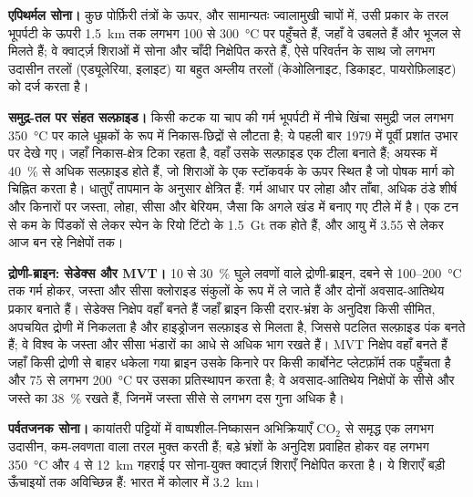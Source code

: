 \textbf{एपिथर्मल सोना।} कुछ पोर्फ़िरी तंत्रों के ऊपर, और सामान्यतः ज्वालामुखी चापों में, उसी प्रकार के
तरल भूपर्पटी के ऊपरी \qty{1.5}{km} तक लगभग 100 से \qty{300}{\celsius} पर पहुँचते हैं, जहाँ वे उबलते हैं
और भूजल से मिलते हैं; वे क्वार्ट्ज़ शिराओं में सोना और चाँदी निक्षेपित करते हैं, ऐसे परिवर्तन के साथ जो
लगभग उदासीन तरलों (एड्यूलेरिया, इलाइट) या बहुत अम्लीय तरलों (केओलिनाइट, डिकाइट, पायरोफ़िलाइट) को
दर्ज करता है।

\textbf{समुद्र-तल पर संहत सल्फ़ाइड।} किसी कटक या चाप की गर्म भूपर्पटी में नीचे खिंचा समुद्री जल लगभग
\qty{350}{\celsius} पर काले धूम्रकों के रूप में निकास-छिद्रों से लौटता है; ये पहली बार 1979 में पूर्वी प्रशांत
उभार पर देखे गए। जहाँ निकास-क्षेत्र टिका रहता है, वहाँ उसके सल्फ़ाइड एक टीला बनाते हैं; अयस्क में
\qty{40}{\percent} से अधिक सल्फ़ाइड होते हैं, जो शिराओं के एक स्टॉकवर्क के ऊपर स्थित है जो पोषक मार्ग को
चिह्नित करता है। धातुएँ तापमान के अनुसार क्षेत्रित हैं: गर्म आधार पर लोहा और ताँबा, अधिक ठंडे शीर्ष और
किनारों पर जस्ता, लोहा, सीसा और बेरियम, जैसा कि अगले खंड में बनाए गए टीले में है।  एक टन से कम के पिंडकों से लेकर स्पेन के रियो टिंटो के \qty{1.5}{Gt} तक होते हैं, और आयु
में \qty{3.55}{\Ga} से लेकर आज बन रहे निक्षेपों तक।

\textbf{द्रोणी-ब्राइन: सेडेक्स और MVT।} 10 से \qty{30}{\percent} घुले लवणों वाले द्रोणी-ब्राइन, दबने से
100--\qty{200}{\celsius} तक गर्म होकर, जस्ता और सीसा क्लोराइड संकुलों के रूप में ले जाते हैं और दोनों
अवसाद-आतिथेय प्रकार बनाते हैं। सेडेक्स निक्षेप वहाँ बनते हैं जहाँ ब्राइन किसी दरार-भ्रंश के अनुदिश किसी
सीमित, अपचयित द्रोणी में निकलता है और हाइड्रोजन सल्फ़ाइड से मिलता है, जिससे पटलित सल्फ़ाइड पंक बनते हैं;
वे विश्व के जस्ता और सीसा भंडारों का आधे से अधिक भाग रखते हैं। MVT निक्षेप वहाँ बनते हैं जहाँ किसी द्रोणी
से बाहर धकेला गया ब्राइन उसके किनारे पर किसी कार्बोनेट प्लेटफ़ॉर्म तक पहुँचता है और 75 से लगभग
\qty{200}{\celsius} पर उसका प्रतिस्थापन करता है; वे अवसाद-आतिथेय निक्षेपों के सीसे और जस्ते का
\qty{38}{\percent} रखते हैं, जिनमें जस्ता सीसे से लगभग दस गुना अधिक है।

\textbf{पर्वतजनक सोना।} कायांतरी पट्टियों में वाष्पशील-निष्कासन अभिक्रियाएँ CO$_2$ से समृद्ध एक लगभग
उदासीन, कम-लवणता वाला तरल मुक्त करती हैं; बड़े भ्रंशों के अनुदिश प्रवाहित होकर वह लगभग \qty{350}{\celsius}
और 4 से \qty{12}{km} गहराई पर सोना-युक्त क्वार्ट्ज़ शिराएँ निक्षेपित करता है। ये शिराएँ बड़ी ऊँचाइयों तक
अविच्छिन्न हैं: भारत में कोलार में \qty{3.2}{km}।

